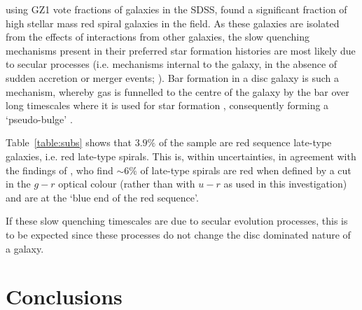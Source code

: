 \citet{Bamford09} using GZ1 vote fractions of galaxies in the SDSS, found a significant fraction of high stellar mass red spiral galaxies in the field. As these galaxies are isolated from the effects of interactions from other galaxies, the slow quenching mechanisms present in their preferred star formation histories are most likely due to secular processes (i.e. mechanisms internal to the galaxy, in the absence of sudden accretion or merger events; \citealt{kormendy04, Sheth12}). Bar formation in a disc galaxy is such a mechanism, whereby gas is funnelled to the centre of the galaxy by the bar over long timescales where it is used for star formation \citep{masters12a, saintonge12, Cheung13}, consequently forming a `pseudo-bulge' \citep{Kormendy10, Simmons13}.

Table~\ref{table:subs} shows that $3.9\%$ of the sample are red sequence late-type galaxies, i.e. red late-type spirals. This is, within uncertainties, in agreement with the findings of \citet{masters10c}, who find $\sim6\%$ of late-type spirals are red when defined by a cut in the $g-r$ optical colour (rather than with $u-r$ as used in this investigation) and are at the `blue end of the red sequence'. 

If these slow quenching timescales are due to secular evolution processes, this is to be expected since these processes do not change the disc dominated nature of a galaxy. 

\section{Conclusions}\label{morph:conc}

